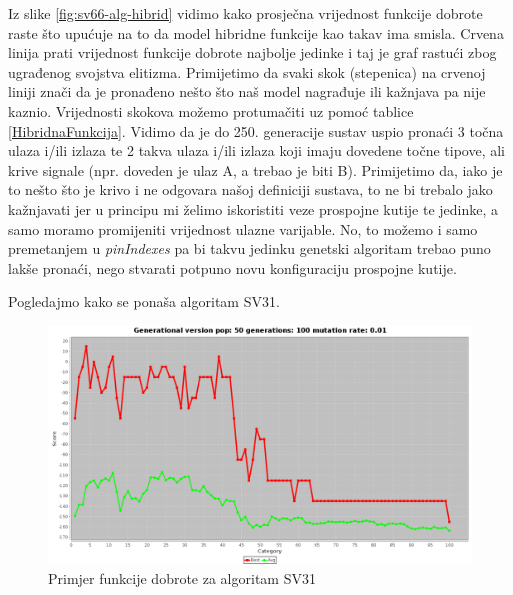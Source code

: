\documentclass[times, utf8, zavrsni]{fer}
\begin{document}
	Iz slike \ref{fig:sv66-alg-hibrid} vidimo kako prosječna vrijednost funkcije dobrote raste što upućuje na to da model hibridne funkcije kao takav ima smisla. Crvena linija prati vrijednost funkcije dobrote najbolje jedinke i taj je graf rastući zbog ugrađenog svojstva elitizma. Primijetimo da svaki skok (stepenica) na crvenoj liniji znači da je pronađeno nešto što naš model nagrađuje ili kažnjava pa nije kaznio. Vrijednosti skokova možemo protumačiti uz pomoć tablice \ref{HibridnaFunkcija}. Vidimo da je do 250. generacije sustav uspio pronaći 3 točna ulaza i/ili izlaza te 2 takva ulaza i/ili izlaza koji imaju dovedene točne tipove, ali krive signale (npr. doveden je ulaz A, a trebao je biti B). Primijetimo da, iako je to nešto što je krivo i ne odgovara našoj definiciji sustava, to ne bi trebalo jako kažnjavati jer u principu mi želimo iskoristiti veze prospojne kutije te jedinke, a samo moramo promijeniti vrijednost ulazne varijable. No, to možemo i samo premetanjem u \emph{pinIndexes} pa bi takvu jedinku genetski algoritam trebao puno lakše pronaći, nego stvarati potpuno novu konfiguraciju prospojne kutije. 
	
	Pogledajmo kako se ponaša algoritam SV31. 
	
	\begin{figure}[H]
		\centering
		\includegraphics[width=18cm]{slike/SV31Hibrid.png}
		\caption{Primjer funkcije dobrote za algoritam SV31}
		\label{fig:sv31-alg-hibrid}
	\end{figure} 
	
\end{document}
